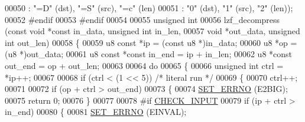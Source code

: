 \begin{DoxyCode}
00050         \textcolor{preprocessor}{:} \textcolor{stringliteral}{"=D"} \textcolor{preprocessor}{(}\textcolor{preprocessor}{dst}\textcolor{preprocessor}{)}\textcolor{preprocessor}{,} \textcolor{stringliteral}{"=S"} \textcolor{preprocessor}{(}\textcolor{preprocessor}{src}\textcolor{preprocessor}{)}\textcolor{preprocessor}{,} \textcolor{stringliteral}{"=c"} \textcolor{preprocessor}{(}\textcolor{preprocessor}{len}\textcolor{preprocessor}{)}
00051         \textcolor{preprocessor}{:}  \textcolor{stringliteral}{"0"} \textcolor{preprocessor}{(}\textcolor{preprocessor}{dst}\textcolor{preprocessor}{)}\textcolor{preprocessor}{,}  \textcolor{stringliteral}{"1"} \textcolor{preprocessor}{(}\textcolor{preprocessor}{src}\textcolor{preprocessor}{)}\textcolor{preprocessor}{,}  \textcolor{stringliteral}{"2"} \textcolor{preprocessor}{(}\textcolor{preprocessor}{len}\textcolor{preprocessor}{)}\textcolor{preprocessor}{)}\textcolor{preprocessor}{;}
00052 \textcolor{preprocessor}{#}\textcolor{preprocessor}{endif}
00053 \textcolor{preprocessor}{#}\textcolor{preprocessor}{endif}
00054 
00055 \textcolor{keywordtype}{unsigned} \textcolor{keywordtype}{int}
00056 lzf\_decompress (\textcolor{keyword}{const} \textcolor{keywordtype}{void} *\textcolor{keyword}{const} in\_data,  \textcolor{keywordtype}{unsigned} \textcolor{keywordtype}{int} in\_len,
00057                 \textcolor{keywordtype}{void}             *out\_data, \textcolor{keywordtype}{unsigned} \textcolor{keywordtype}{int} out\_len)
00058 \{
00059   u8 \textcolor{keyword}{const} *ip = (\textcolor{keyword}{const} u8 *)in\_data;
00060   u8       *op = (u8 *)out\_data;
00061   u8 \textcolor{keyword}{const} *\textcolor{keyword}{const} in\_end  = ip + in\_len;
00062   u8       *\textcolor{keyword}{const} out\_end = op + out\_len;
00063 
00064   \textcolor{keywordflow}{do}
00065     \{
00066       \textcolor{keywordtype}{unsigned} \textcolor{keywordtype}{int} ctrl = *ip++;
00067 
00068       \textcolor{keywordflow}{if} (ctrl < (1 << 5)) \textcolor{comment}{/* literal run */}
00069         \{
00070           ctrl++;
00071 
00072           \textcolor{keywordflow}{if} (op + ctrl > out\_end)
00073             \{
00074               \hyperlink{lzf__d_8c_a9539a5281f41104073dfbcb2ebf35f9d}{SET\_ERRNO} (E2BIG);
00075               \textcolor{keywordflow}{return} 0;
00076             \}
00077 
00078 \textcolor{preprocessor}{#}\textcolor{preprocessor}{if} \hyperlink{lzfP_8h_a1a4fde3dbdd8e8f920a325f551fcfd94}{CHECK\_INPUT}
00079           \textcolor{keywordflow}{if} (ip + ctrl > in\_end)
00080             \{
00081               \hyperlink{lzf__d_8c_a9539a5281f41104073dfbcb2ebf35f9d}{SET\_ERRNO} (EINVAL);

\end{DoxyCode}
